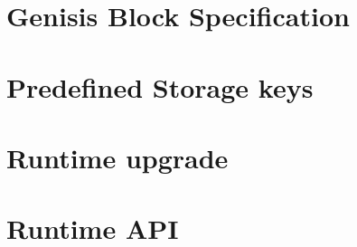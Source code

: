 \documentclass{article}
\begin{document}
\section{Genisis Block Specification}\label{sect-genisis-block}

\section{Predefined Storage keys}\label{sect-predef-storage-keys}

\section{Runtime upgrade}\label{sect-runtime-upgrade}

\section{Runtime API}\label{sect-runtime-api}
\end{document}
